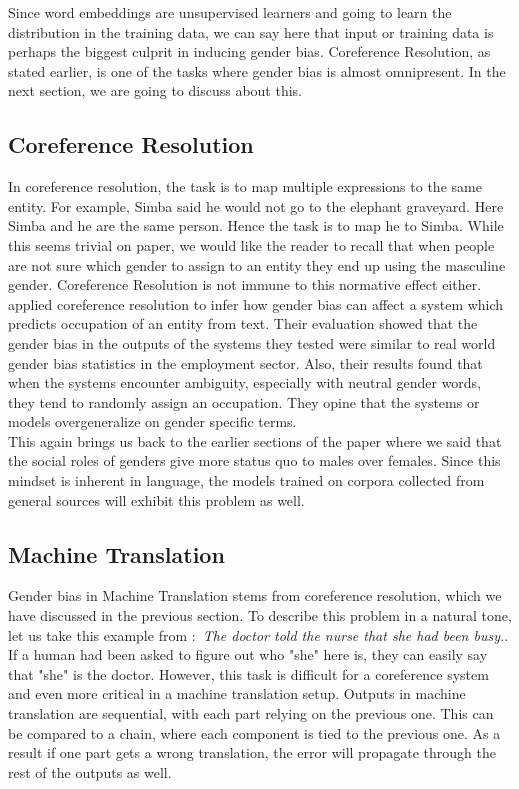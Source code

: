 \documentclass{article}
\begin{document}
\noindent
Since word embeddings are unsupervised learners and going to learn the distribution in the training data, we can say here that input or training data is perhaps the biggest culprit in inducing gender bias. Coreference Resolution, as stated earlier, is one of the tasks where gender bias is almost omnipresent. In the next section, we are going to discuss about this. 


\subsection*{Coreference Resolution}
In coreference resolution, the task is to map multiple expressions to the same entity. For example, Simba said he would not go to the elephant graveyard. Here Simba and he are the same person. Hence the task is to map he to Simba. While this seems trivial on paper, we would like the reader to recall that when people are not sure which gender to assign to an entity they end up using the masculine gender. Coreference Resolution is not immune to this normative effect either. \\

\noindent
\cite{rudinger-etal-2018-gender} applied coreference resolution to infer how gender bias can affect a system which predicts occupation of an entity from text. Their evaluation showed that the gender bias in the outputs of the systems they tested were similar to real world gender bias statistics in the employment sector. Also, their results found that when the systems encounter ambiguity, especially with neutral gender words, they tend to randomly assign an occupation. They opine that the systems or models overgeneralize on gender specific terms. \\ 

\noindent
This again brings us back to the earlier sections of the paper where we said that the social roles of genders give more status quo to males over females. Since this mindset is inherent in language, the models trained on corpora collected from general sources will exhibit this problem as well. 

\subsection*{Machine Translation}
Gender bias in Machine Translation stems from coreference resolution, which we have discussed in the previous section. To describe this problem in a natural tone, let us take this example from \cite{saunders-byrne-2020-reducing} $:$ \textit{The doctor told the nurse that she had been busy.}. If a human had been asked to figure out who "she" here is, they can easily say that "she" is the doctor. However, this task is difficult for a coreference system \cite{gaut-etal-2020-towards} and even more critical in a machine translation setup. Outputs in machine translation are sequential, with each part relying on the previous one. This can be compared to a chain, where each component is tied to the previous one. As a result if one part gets a wrong translation, the error will propagate through the rest of the outputs as well. \\
\end{document}
